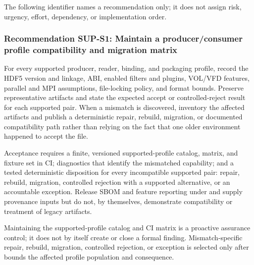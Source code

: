\documentclass[../main.tex]{subfiles}
\begin{document}
The following identifier names a recommendation only; it does not assign risk,
urgency, effort, dependency, or implementation order.

\subsubsection*{Recommendation SUP-S1: Maintain a producer/consumer profile
compatibility and migration matrix}

For every supported producer, reader, binding, and packaging profile, record the
HDF5 version and linkage, ABI, enabled filters and plugins, VOL/VFD features,
parallel and MPI assumptions, file-locking policy, and format bounds. Preserve
representative artifacts and state the expected accept or controlled-reject
result for each supported pair. When a mismatch is discovered, inventory the
affected artifacts and publish a deterministic repair, rebuild, migration, or
documented compatibility path rather than relying on the fact that one older
environment happened to accept the file.

Acceptance requires a finite, versioned supported-profile catalog, matrix, and
fixture set in CI; diagnostics that identify the mismatched capability; and a
tested deterministic disposition for every incompatible supported pair:
repair, rebuild, migration, controlled rejection with a supported alternative,
or an accountable exception. Release SBOM and feature reporting under
 and  supply provenance inputs but do not, by
themselves, demonstrate compatibility or treatment of legacy artifacts.

Maintaining the supported-profile catalog and CI matrix is a proactive
assurance control; it does not by itself create or close a formal finding.
Mismatch-specific repair, rebuild, migration, controlled rejection, or
exception is selected only after  bounds the affected profile
population and consequence.
\end{document}
